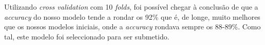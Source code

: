Utilizando \textit{cross validation} com 10 \textit{folds}, foi possível chegar à conclusão de que a \textit{accuracy} do nosso modelo tende a rondar os 92\% que é, de longe, muito melhores que os nossos modelos iniciais, onde a \textit{accuracy} rondava sempre os 88-89\%. Como tal, este modelo foi seleccionado para ser submetido.